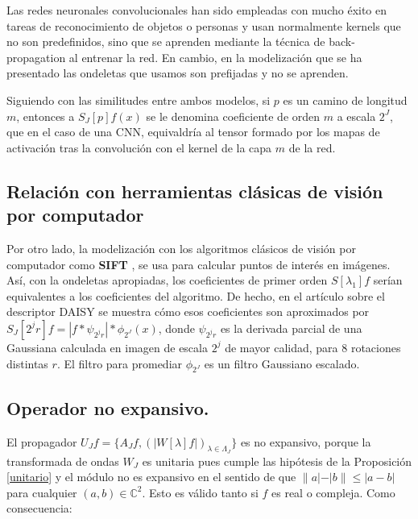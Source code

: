 \medskip

\noindent Las redes neuronales convolucionales han sido empleadas con mucho éxito en tareas de reconocimiento de objetos o personas y usan normalmente kernels que no son predefinidos, sino que se aprenden mediante la técnica de back-propagation al entrenar la red. En cambio, en la modelización que se ha presentado las ondeletas que usamos son prefijadas y no se aprenden.

\medskip

\noindent Siguiendo con las similitudes entre ambos modelos, si $p$ es un camino de longitud $m$, entonces a $S_J[p] f(x)$ se le denomina coeficiente de orden $m$ a escala $2^J$, que en el caso de una CNN, equivaldría al tensor formado por los mapas de activación tras la convolución con el kernel de la capa $m$ de la red. 

\medskip


\subsection{Relación con herramientas clásicas de visión por computador}
\noindent Por otro lado, la modelización  con los algoritmos clásicos de visión por computador como \textbf{SIFT}  \cite{DistinctiveImageFeatures}, se usa para calcular puntos de interés en imágenes. Así, con la ondeletas apropiadas, los coeficientes de primer orden $S[\lambda_1] f$ serían equivalentes a los coeficientes del algoritmo. De hecho, en el artículo sobre el descriptor DAISY \cite{Daisy} se muestra cómo esos coeficientes son aproximados por $S_J[2^j r] f= | f \ast \psi_{2^j r} | \ast \phi_{2^J}(x)$, donde $\psi_{2^j r}$ es la derivada parcial de una Gaussiana calculada en imagen de escala $2^j$ de mayor calidad, para 8 rotaciones distintas $r$. El filtro para promediar $\phi_{2^J}$ es un filtro Gaussiano escalado.


\subsection{Operador no expansivo.}

\noindent El propagador $U_Jf=\lbrace A_Jf, \left(\left| W[\lambda]f\right|\right)_{\lambda\in\Lambda_J} \rbrace$ es no expansivo, porque la transformada de ondas $W_J$ es unitaria pues cumple las hipótesis de la Proposición \ref{unitario} y el módulo no es expansivo en el sentido de que $\|a|-|b\|\leq |a-b|$ para cualquier $(a,b)\in \mathbb{C}^2$. Esto es válido tanto si $f$ es real o compleja. Como consecuencia: 

